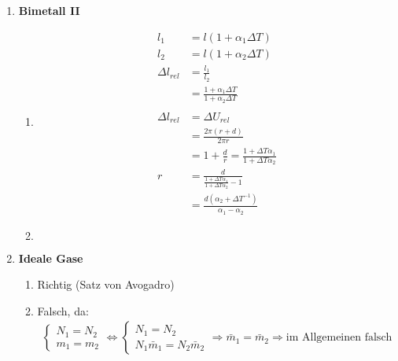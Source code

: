 \documentclass[11pt,letterpaper]{article}
\begin{document}
\begin{enumerate}
    \item \textbf{Bimetall II}
    \begin{enumerate}
        \item 
            \begin{align*}
                l_1 &= l(1+\alpha_1 \Delta T)\\
                l_2 &= l(1+\alpha_2 \Delta T)\\ 
                \Delta l_{rel} &= \frac{l_1}{l_2}\\
                &= \frac{1+\alpha_1 \Delta T}{1+\alpha_2\Delta T }\\
                \\
                \Delta l_{rel} &= \Delta U_{rel}\\
                &= \frac{2\pi(r+d)}{2\pi r} \\
                &= 1+ \frac{d}{r}=\frac{1+\Delta T \alpha_1}{1+\Delta T \alpha_2}\\
                r &= \frac{d}{\frac{1+\Delta T \alpha_1}{1+\Delta T \alpha_2}-1}\\  
                &= \frac{d(\alpha_2 +\Delta T^{-1})}{\alpha_1-\alpha_2}
            \end{align*}
        \item 
            \begin{align*}
            \end{align*}
    \end{enumerate}

    \item \textbf{Ideale Gase}
    \begin{enumerate}
        \item Richtig (Satz von Avogadro)
        \item Falsch, da:
            \begin{align*}
                \begin{cases}
                     N_1 = N_2\\m_1=m_2
                \end{cases}\Longleftrightarrow 
                \begin{cases}
                    N_1 = N_2\\N_1\bar{m}_1=N_2 \bar{m}_2
                \end{cases}
                \Longrightarrow \bar{m}_1 = \bar{m}_2
                \Longrightarrow \text{im Allgemeinen falsch}
            \end{align*}
            

\end{enumerate}
\end{enumerate}
\end{document}
